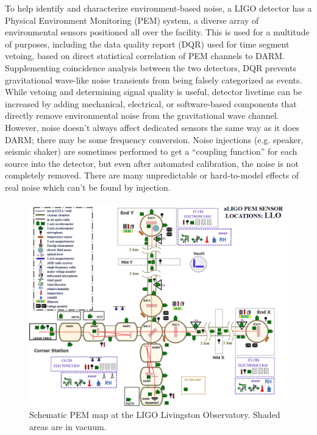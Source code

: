 \documentclass[colorlinks=true,pdfstartview=FitV,linkcolor=blue,
            citecolor=red,urlcolor=magenta]{ligodoc}
\begin{document}
To help identify and characterize environment-based noise, a LIGO detector has a Physical Environment Monitoring (PEM) system, a diverse array of environmental sensors positioned all over the facility.
This is used for a multitude of purposes, including the data quality report (DQR) used for time segment vetoing, based on direct statistical correlation of PEM channels to DARM.
Supplementing coincidence analysis between the two detectors, DQR prevents gravitational wave-like noise transients from being falsely categorized as events.
While vetoing and determining signal quality is useful, detector livetime can be increased by adding mechanical, electrical, or software-based components that directly remove environmental noise from the gravitational wave channel.
However, noise doesn't always affect dedicated sensors the same way as it does DARM; there may be some frequency conversion.
Noise injections (e.g. speaker, seismic shaker) are sometimes performed to get a ``coupling function''\cite{pemcoupling} for each source into the detector, but even after automated calibration, the noise is not completely removed. There are many unpredictable or hard-to-model effects of real noise which can't be found by injection.
\begin{figure}
\includegraphics[width=\textwidth]{llopem.png}
\caption{Schematic PEM map at the LIGO Livingston Observatory. Shaded areas are in vacuum.}
\end{figure}
\end{document}
